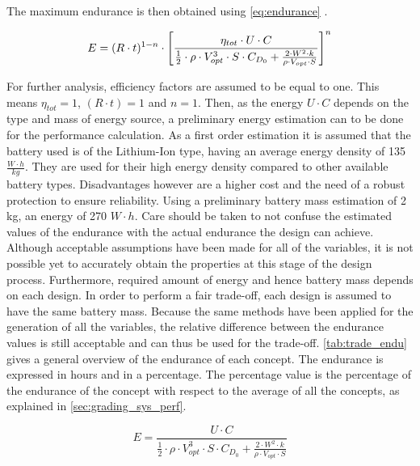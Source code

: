 The maximum endurance is then obtained using \autoref{eq:endurance} \cite{ran_end}.

\begin{equation}
    E = (R\cdot t)^{1-n}\cdot \Bigg{[}\frac{\eta_{tot}\cdot U\cdot C}{\frac{1}{2}\cdot\rho \cdot V_{opt}^3\cdot S\cdot C_{D_0} + \frac{2\cdot W^2\cdot k}{\rho\cdot V_{opt}\cdot S}}\Bigg{]}^n
    \label{eq:endurance}
\end{equation}

For further analysis, efficiency factors are assumed to be equal to one. This means $\eta_{tot}=1$, $(R\cdot t)=1$ and $n=1$. Then, as the energy $U\cdot C$ depends on the type and mass of energy source, a preliminary energy estimation can to be done for the performance calculation. As a first order estimation it is assumed that the battery used is of the Lithium-Ion type, having an average energy density of 135 $\frac{W\cdot h}{kg}$. They are used for their high energy density compared to other available battery types. Disadvantages however are a higher cost and the need of a robust protection to ensure reliability. Using a preliminary battery mass estimation of 2 kg, an energy of 270 $W\cdot h$. Care should be taken to not confuse the estimated values of the endurance with the actual endurance the design can achieve. Although acceptable assumptions have been made for all of the variables, it is not possible yet to accurately obtain the properties at this stage of the design process. Furthermore, required amount of energy and hence battery mass depends on each design. In order to perform a fair trade-off, each design is assumed to have the same battery mass. Because the same methods have been applied for the generation of all the variables, the relative difference between the endurance values is still acceptable and can thus be used for the trade-off. \autoref{tab:trade_endu} gives a general overview of the endurance of each concept. The endurance is expressed in hours and in a percentage. The percentage value is the percentage of the endurance of the concept with respect to the average of all the concepts, as explained in \autoref{sec:grading_sys_perf}.

\begin{equation}
    E =  \frac{U\cdot C}{\frac{1}{2}\cdot \rho\cdot V_{opt}^3\cdot S\cdot C_{D_0} + \frac{2\cdot W^2\cdot k}{\rho \cdot V_{opt}\cdot S}}
    \label{eq:endurance_simpl}
\end{equation}

